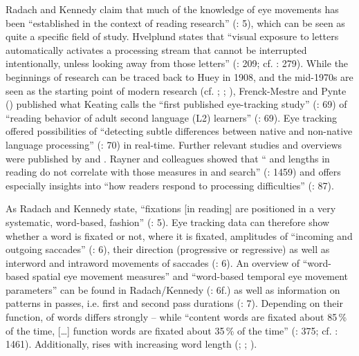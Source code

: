 Radach and Kennedy claim that much of the knowledge of eye movements has been “established in the context of reading research” (\citeyear{radach-kennedy2004}: 5), which can be seen as quite a specific field of study. Hvelplund states that “visual exposure to letters automatically activates a processing stream that cannot be interrupted intentionally, unless looking away from those letters” (\citeyear{Hvelplund2014}: 209; cf. \citealt{Valdes2005}: 279). While the beginnings of  research can be traced back to Huey in 1908, and the mid-1970s are seen as the starting point of modern  research (cf. \citealt{rayner1976}; \citealt{Just1980}; \citealt{rayner1989}), Frenck-Mestre and Pynte (\citeyear{Frenck-mestre1997}) published what Keating calls the “first published eye-tracking study” (\citeyear{Keating2014}: 69) of “reading behavior of adult second language (L2) learners” (\citeyear{Keating2014}: 69). Eye tracking offered possibilities of “detecting subtle differences between native and non-native language processing” (\citealt{Keating2014}: 70) in real-time. Further relevant studies and overviews were published by \citet{rayner1998} and \citet{radach-inhoff-heller2004}. Rayner and colleagues showed that “ and  lengths in reading do not correlate with those measures in  and search” (\citealt{rayner2009}: 1459) and offers especially insights into “how readers respond to processing difficulties” (\citealt{Keating2014}: 87).

As Radach and Kennedy state, “fixations [in reading] are positioned in a very systematic, word-based, fashion” (\citeyear{radach-kennedy2004}: 5). Eye tracking data can therefore show whether a word is fixated or not, where it is fixated, amplitudes of “incoming and outgoing saccades” (\citealt{radach-kennedy2004}: 6), their direction (progressive or regressive) as well as interword and intraword movements of saccades (\citealt{radach-kennedy2004}: 6). An overview of “word-based spatial eye movement measures” and “word-based temporal eye movement parameters” can be found in Radach/Kennedy (\citeyear{radach-kennedy2004}: 6f.) as well as information on  patterns in passes, i.e. first and second pass  durations (\citealt{radach-kennedy2004}: 7). Depending on their function,  of words differs strongly – while “content words are fixated about 85\,\% of the time, […] function words are fixated about 35\,\% of the time” (\citealt{rayner1998}: 375; cf. \citealt{rayner2009}: 1461). Additionally,  rises with increasing word length (\citealt{rayner1976}; \citealt{rayner1996}; \citealt{rayner2009}).

